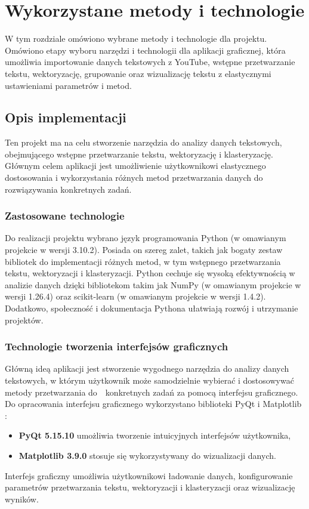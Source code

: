 \chapter{Wykorzystane metody i technologie}

	
W tym rozdziale omówiono wybrane metody i technologie dla projektu. Omówiono etapy wyboru narzędzi i technologii dla aplikacji graficznej, która umożliwia importowanie danych tekstowych z YouTube, wstępne przetwarzanie tekstu, wektoryzację, grupowanie oraz wizualizację tekstu z elastycznymi ustawieniami parametrów i metod.
	
		
\section{Opis implementacji}

	Ten projekt ma na celu stworzenie narzędzia do analizy danych tekstowych, obejmującego wstępne przetwarzanie tekstu, wektoryzację i klasteryzację. Głównym celem aplikacji jest umożliwienie użytkownikowi elastycznego dostosowania i wykorzystania różnych metod przetwarzania danych do rozwiązywania konkretnych zadań.
	
		
	\subsection{Zastosowane technologie}
		Do realizacji projektu wybrano język programowania Python (w omawianym projekcie w wersji 3.10.2). Posiada on szereg zalet, takich jak bogaty zestaw bibliotek do implementacji różnych metod, w tym wstępnego przetwarzania tekstu, wektoryzacji i klasteryzacji. Python cechuje się wysoką efektywnością w analizie danych dzięki bibliotekom takim jak NumPy (w omawianym projekcie w wersji 1.26.4) oraz scikit-learn (w omawianym projekcie w wersji 1.4.2). Dodatkowo, społeczność i dokumentacja Pythona ułatwiają rozwój i utrzymanie projektów.
		
		
	\subsection{Technologie tworzenia interfejsów graficznych}
	Główną ideą aplikacji jest stworzenie wygodnego narzędzia do analizy danych tekstowych, w którym użytkownik może samodzielnie wybierać i dostosowywać metody przetwarzania do~~konkretnych zadań za pomocą interfejsu graficznego. Do opracowania interfejsu graficznego wykorzystano biblioteki PyQt i Matplotlib \cite{PyQt, MatPlotLib}:

		\begin{itemize}
			\item \textbf{PyQt 5.15.10} umożliwia tworzenie intuicyjnych interfejsów użytkownika,
			\item \textbf{Matplotlib 3.9.0} stosuje się wykorzystywany do wizualizacji danych.
		\end{itemize}
		Interfejs graficzny umożliwia użytkownikowi ładowanie danych, konfigurowanie parametrów przetwarzania tekstu, wektoryzacji i klasteryzacji oraz wizualizację wyników.
		
